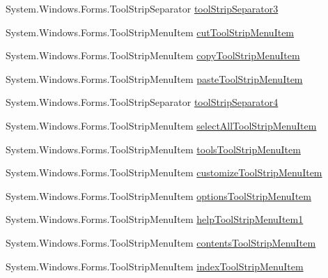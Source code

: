 \begin{DoxyCompactItemize}
\item 
\-System.\-Windows.\-Forms.\-Tool\-Strip\-Separator \hyperlink{class_sr_p___classroom_inq_1_1frm_classrrom_inq_ac7f725652d980e8ef92f1119843f02a0}{tool\-Strip\-Separator3}
\item 
\-System.\-Windows.\-Forms.\-Tool\-Strip\-Menu\-Item \hyperlink{class_sr_p___classroom_inq_1_1frm_classrrom_inq_a62b714f774f74f0e4a36f60909cf7d78}{cut\-Tool\-Strip\-Menu\-Item}
\item 
\-System.\-Windows.\-Forms.\-Tool\-Strip\-Menu\-Item \hyperlink{class_sr_p___classroom_inq_1_1frm_classrrom_inq_a945826606f8dc78bfaaa45591619ecfc}{copy\-Tool\-Strip\-Menu\-Item}
\item 
\-System.\-Windows.\-Forms.\-Tool\-Strip\-Menu\-Item \hyperlink{class_sr_p___classroom_inq_1_1frm_classrrom_inq_a6cd3b1f68a59b97544531e749b77e868}{paste\-Tool\-Strip\-Menu\-Item}
\item 
\-System.\-Windows.\-Forms.\-Tool\-Strip\-Separator \hyperlink{class_sr_p___classroom_inq_1_1frm_classrrom_inq_a4b694b6ce3670642d724af5e79c46031}{tool\-Strip\-Separator4}
\item 
\-System.\-Windows.\-Forms.\-Tool\-Strip\-Menu\-Item \hyperlink{class_sr_p___classroom_inq_1_1frm_classrrom_inq_a7e6e1b306acf890605ad11f6aca7fce7}{select\-All\-Tool\-Strip\-Menu\-Item}
\item 
\-System.\-Windows.\-Forms.\-Tool\-Strip\-Menu\-Item \hyperlink{class_sr_p___classroom_inq_1_1frm_classrrom_inq_a89a0ae0ac6568cec51bb828874802c28}{tools\-Tool\-Strip\-Menu\-Item}
\item 
\-System.\-Windows.\-Forms.\-Tool\-Strip\-Menu\-Item \hyperlink{class_sr_p___classroom_inq_1_1frm_classrrom_inq_a3296cc0b41841b3014df5c5759d9e839}{customize\-Tool\-Strip\-Menu\-Item}
\item 
\-System.\-Windows.\-Forms.\-Tool\-Strip\-Menu\-Item \hyperlink{class_sr_p___classroom_inq_1_1frm_classrrom_inq_acdc1111ba8acc3bb1ee140845f069521}{options\-Tool\-Strip\-Menu\-Item}
\item 
\-System.\-Windows.\-Forms.\-Tool\-Strip\-Menu\-Item \hyperlink{class_sr_p___classroom_inq_1_1frm_classrrom_inq_a09bf82e0de8e7288e39988c7bfc5f5e7}{help\-Tool\-Strip\-Menu\-Item1}
\item 
\-System.\-Windows.\-Forms.\-Tool\-Strip\-Menu\-Item \hyperlink{class_sr_p___classroom_inq_1_1frm_classrrom_inq_ac8e6b07efe8b6fe7e1a82d326648f88e}{contents\-Tool\-Strip\-Menu\-Item}
\item 
\-System.\-Windows.\-Forms.\-Tool\-Strip\-Menu\-Item \hyperlink{class_sr_p___classroom_inq_1_1frm_classrrom_inq_a650650a8a1948b902bae347f3cdf9679}{index\-Tool\-Strip\-Menu\-Item}

\end{DoxyCompactItemize}
